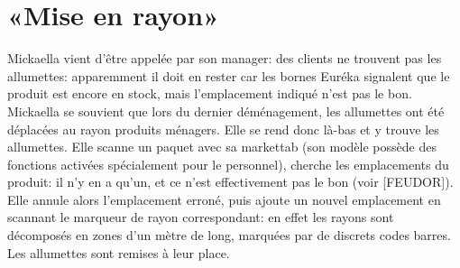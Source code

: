 \section{«Mise en rayon»}
Mickaella vient d'être appelée par son manager: des clients ne trouvent pas les allumettes: apparemment il doit en rester car les bornes Euréka signalent que le produit est encore en stock, mais l'emplacement indiqué n'est pas le bon.
Mickaella se souvient que lors du dernier déménagement, les allumettes ont été déplacées au rayon produits ménagers.
Elle se rend donc là-bas et y trouve les allumettes.
Elle scanne un paquet avec sa markettab (son modèle possède des fonctions activées spécialement pour le personnel), cherche les emplacements du produit: il n'y en a qu'un, et ce n'est effectivement pas le bon (voir [FEUDOR]).
Elle annule alors l'emplacement erroné, puis ajoute un nouvel emplacement en scannant le marqueur de rayon correspondant: en effet les rayons sont décomposés en zones d'un mètre de long, marquées par de discrets codes barres.
Les allumettes sont remises à leur place.
